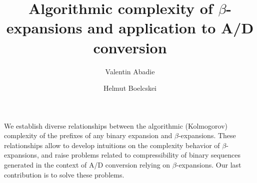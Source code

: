 \documentclass[12pt, a4paper]{article}
\begin{document}
\title{Algorithmic complexity of $\beta$-expansions and application to A/D conversion}
\author{Valentin Abadie \and Helmut Boelcskei}
\date{}
\maketitle



We establish diverse relationships between the algorithmic (Kolmogorov) complexity of the prefixes of any binary expansion and $\beta$-expansions. These relationships allow to develop intuitions on the complexity behavior of $\beta$-expansions, and raise problems related to compressibility of binary sequences generated in the context of A/D conversion relying on $\beta$-expansions. Our last contribution is to solve these problems.

\tableofcontents

\begingroup
\let\clearpage\relax

\endgroup

\begingroup
\let\clearpage\relax

\endgroup

\begingroup
\let\clearpage\relax

\endgroup

\begingroup
\let\clearpage\relax

\endgroup

\begingroup
\let\clearpage\relax

\endgroup

\begingroup
\let\clearpage\relax

\endgroup

\begingroup
\let\clearpage\relax

\endgroup

\begingroup
\let\clearpage\relax

\endgroup


\end{document}
